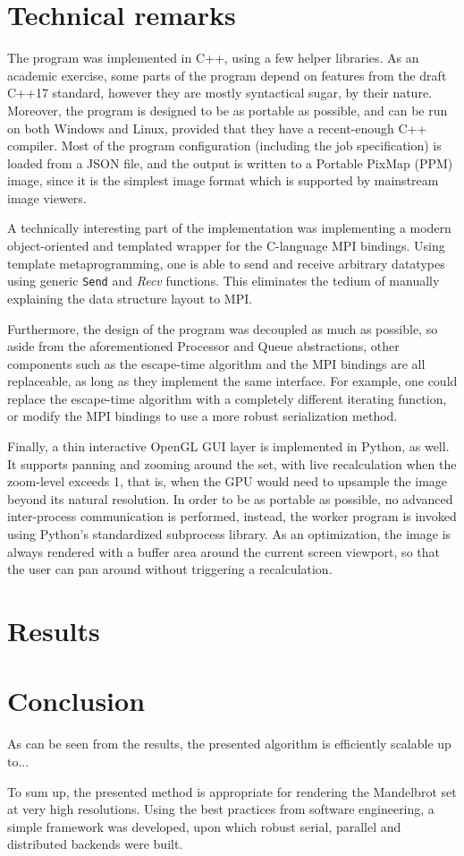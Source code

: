 \documentclass[a4paper]{article}
\begin{document}
	\section{Technical remarks}
	The program was implemented in C++, using a few helper libraries. As an academic exercise, some parts of the program depend on features from the draft C++17 standard, however they are mostly syntactical sugar, by their nature. Moreover, the program is designed to be as portable as possible, and can be run on both Windows and Linux, provided that they have a recent-enough C++ compiler. Most of the program configuration (including the job specification) is loaded from a JSON file, and the output is written to a Portable PixMap (PPM) image, since it is the simplest image format which is supported by mainstream image viewers.
	
	A technically interesting part of the implementation was implementing a modern object-oriented and templated wrapper for the C-language MPI bindings. Using template metaprogramming, one is able to send and receive arbitrary datatypes using generic \texttt{Send} and \emph{Recv} functions. This eliminates the tedium of manually explaining the data structure layout to MPI.
	
	Furthermore, the design of the program was decoupled as much as possible, so aside from the aforementioned Processor and Queue abstractions, other components such as the escape-time algorithm and the MPI bindings are all replaceable, as long as they implement the same interface. For example, one could replace the escape-time algorithm with a completely different iterating function, or modify the MPI bindings to use a more robust serialization method.
	
	Finally, a thin interactive OpenGL GUI layer is implemented in Python, as well. It supports panning and zooming around the set, with live recalculation when the zoom-level exceeds 1, that is, when the GPU would need to upsample the image beyond its natural resolution. In order to be as portable as possible, no advanced inter-process communication is performed, instead, the worker program is invoked using Python's standardized subprocess library. As an optimization, the image is always rendered with a buffer area around the current screen viewport, so that the user can pan around without triggering a recalculation.
	
	\section{Results}
	
	\section{Conclusion}
	As can be seen from the results, the presented algorithm is efficiently scalable up to...
	
	To sum up, the presented method is appropriate for rendering the Mandelbrot set at very high resolutions. Using the best practices from software engineering, a simple framework was developed, upon which robust serial, parallel and distributed backends were built.
	
\end{document}
